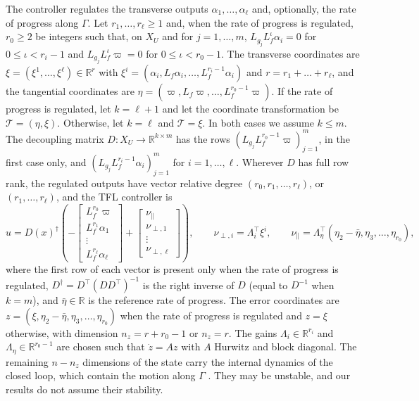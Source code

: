 \documentclass{l4dc2027}
\newcommand{\R}{\mathbb{R}}
\newcommand{\Tm}{\mathcal T}
\begin{document}
 The controller regulates the transverse outputs $\alpha_1,\dots,\alpha_\ell$ and, optionally, the rate of progress along $\Gamma$. Let $r_1,\dots,r_\ell\ge1$ and, when the rate of progress is regulated, $r_0\ge2$ be integers such that, on $X_U$ and for $j=1,\dots,m$, $L_{g_j}L_f^\iota\alpha_i=0$ for $0\le\iota<r_i-1$ and $L_{g_j}L_f^\iota\varpi=0$ for $0\le\iota<r_0-1$. The transverse coordinates are $\xi=(\xi^1,\dots,\xi^\ell)\in\R^r$ with $\xi^i=(\alpha_i,L_f\alpha_i,\dots,L_f^{r_i-1}\alpha_i)$ and $r=r_1+\dots+r_\ell$, and the tangential coordinates are $\eta=(\varpi,L_f\varpi,\dots,L_f^{r_0-1}\varpi)$. If the rate of progress is regulated, let $k=\ell+1$ and let the coordinate transformation be $\Tm=(\eta,\xi)$. Otherwise, let $k=\ell$ and $\Tm=\xi$. In both cases we assume $k\le m$. The decoupling matrix $D:X_U\to\R^{k\times m}$ has the rows $(L_{g_j}L_f^{r_0-1}\varpi)_{j=1}^m$, in the first case only, and $(L_{g_j}L_f^{r_i-1}\alpha_i)_{j=1}^m$ for $i=1,\dots,\ell$. Wherever $D$ has full row rank, the regulated outputs have vector relative degree $(r_0,r_1,\dots,r_\ell)$, or $(r_1,\dots,r_\ell)$, and the TFL controller is
\begin{equation}\label{eq:tfl}
u=D(x)^\dagger\left(-\begin{bmatrix}L_f^{r_0}\varpi\\ L_f^{r_1}\alpha_1\\ \vdots\\ L_f^{r_\ell}\alpha_\ell\end{bmatrix}+\begin{bmatrix}\nu_\parallel\\ \nu_{\perp,1}\\ \vdots\\ \nu_{\perp,\ell}\end{bmatrix}\right),\qquad \nu_{\perp,i}=\Lambda_i^\top\xi^i,\qquad \nu_\parallel=\Lambda_\eta^\top(\eta_2-\bar\eta,\eta_3,\dots,\eta_{r_0}),
\end{equation}
where the first row of each vector is present only when the rate of progress is regulated, $D^\dagger=D^\top(DD^\top)^{-1}$ is the right inverse of $D$ (equal to $D^{-1}$ when $k=m$), and $\bar\eta\in\R$ is the reference rate of progress. The error coordinates are $z=(\xi,\eta_2-\bar\eta,\eta_3,\dots,\eta_{r_0})$ when the rate of progress is regulated and $z=\xi$ otherwise, with dimension $n_z=r+r_0-1$ or $n_z=r$. The gains $\Lambda_i\in\R^{r_i}$ and $\Lambda_\eta\in\R^{r_0-1}$ are chosen such that $\dot z=Az$ with $A$ Hurwitz and block diagonal. The remaining $n-n_z$ dimensions of the state carry the internal dynamics of the closed loop, which contain the motion along $\Gamma$ \citep{nielsen2006}. They may be unstable, and our results do not assume their stability.
\end{document}
